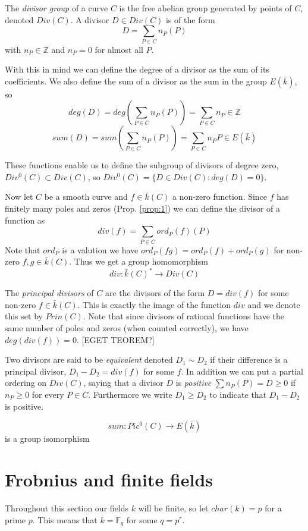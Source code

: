 \documentclass[a4paper,10pt]{amsart}
\begin{document}
\begin{mydef}
 The \emph{divisor group} of a curve $C$ is the free abelian group generated by
points of $C$, denoted $Div(C)$. A divisor $D\in Div(C)$ is of the form
$$ D = \sum_{P\in C} n_P(P)$$
with $n_P\in\mathbb{Z}$ and $n_P = 0$ for almost all $P$.
\end{mydef}

With this in mind we can define the degree of a divisor as the sum of its 
coefficients. We also define the sum of a divisor as the sum in the group $E(\bar{k})$, so
$$ deg(D) = deg(\sum_{P\in C} n_P(P)) = \sum_{P\in C} n_P \in \mathbb{Z}$$
$$ sum(D) = sum(\sum_{P\in C} n_P(P)) = \sum_{P\in C} n_P P \in E(\bar{k})$$

These functions enable us to define the subgroup of divisors of degree zero,
$Div^0(C) \subset Div(C)$, so $Div^0(C) = \{ D\in Div(C) : deg(D) = 0 \}$.

Now let $C$ be a smooth curve and $f\in \bar{k}(C)$ a non-zero function. Since $f$
has finitely many poles and zeros (Prop. \ref{prop:1}) we can define the divisor of a
function as
$$ div(f) = \sum_{P\in C} ord_P(f)(P) $$
Note that $ord_P$ is a valution we have $ord_P(fg) = ord_P(f)+ord_P(g)$
for non-zero $f,g\in \bar{k}(C)$. Thus we get a group homomorphism
$$ div: \bar{k}(C)^* \rightarrow Div(C)$$

\begin{mydef}
 The \emph{principal divisors} of $C$ are the divisors of the form
$ D = div(f) $ for some non-zero $f\in \bar{k}(C)$. This is exactly
the image of the function $div$ and we denote this set by $Prin(C)$.
Note that since divisors of rational functions have the same number of poles
and zeros (when counted correctly), we have $deg(div(f)) = 0$. [EGET TEOREM?]
\end{mydef}

Two divisors are said to be \emph{equivalent} denoted $D_1 \sim D_2$ if
their difference is a principal divisor, $D_1 - D_2 = div(f)$ for some $f$. In
addition we can put a partial ordering on $Div(C)$, saying that a divisor $D$ is
\emph{positive} $\sum n_P(P)=D \geq 0$ if $n_P \geq 0$ for every $P\in C$. Furthermore
we write $D_1 \geq D_2$ to indicate that $D_1 - D_2$ is positive.

\begin{thm}
 $$ sum: Pic^0(C) \rightarrow E(\bar{k}) $$
is a group isomorphism
\end{thm}

\section{Frobnius and finite fields}
Throughout this section our fields $k$ will be finite, so let $char(k) = p$ for
a prime $p$. This means that $k = \mathbb{F}_{q}$ for some $q = p^r$.
\end{document}
